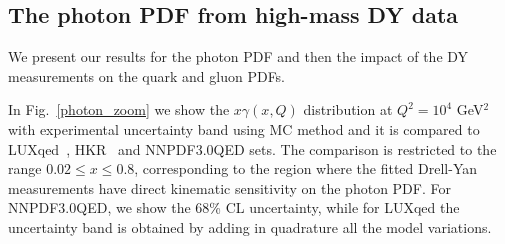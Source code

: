 \subsection{The photon PDF from high-mass DY data}
%
We present our results for the photon PDF and then the impact
of the DY measurements on the quark and gluon PDFs.
%

In Fig.~\ref{photon_zoom} we show  the $x\gamma(x,Q)$ distribution at
$Q^2=10^4$ GeV$^2$ with experimental uncertainty band using MC method and it is compared to LUXqed~\cite{Manohar:2016nzj},
HKR~\cite{Harland-Lang:2016apc} and NNPDF3.0QED sets.
%
The comparison is restricted to the range $0.02 \le x \le 0.8$,
corresponding to the region where the fitted Drell-Yan measurements
have direct kinematic sensitivity on the photon PDF.
%
For NNPDF3.0QED, we show the 68\% CL uncertainty, while for LUXqed the
uncertainty band is obtained by adding in quadrature all the model
variations.

